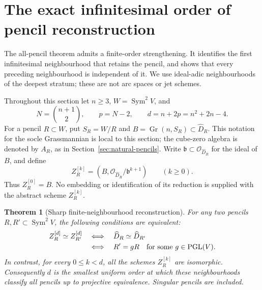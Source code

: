 \documentclass[11pt,reqno]{amsart}
\numberwithin{equation}{section}
\newtheorem{theorem}{Theorem}[section]
\theoremstyle{definition}\newtheorem{definition}[theorem]{Definition}
\theoremstyle{remark}\newtheorem{remark}[theorem]{Remark}
\newcommand{\OO}{\mathcal O}\newcommand{\II}{\mathcal I}
\DeclareMathOperator{\Sym}{Sym}\DeclareMathOperator{\Gr}{Gr}
\begin{document}

\section{The exact infinitesimal order of pencil reconstruction}
\label{sec:finite-neighbourhoods}

The all-pencil theorem admits a finite-order strengthening.  It
identifies the first infinitesimal neighbourhood that retains the
pencil, and shows that every preceding neighbourhood is independent
of it.  We use ideal-adic neighbourhoods of the deepest stratum;
these are not arc spaces or jet schemes.

Throughout this section let \(n\ge3\), \(W=\Sym^2V\), and
\begin{equation}\label{eq:pencil-detection-order}
 N=\binom{n+1}{2},\qquad p=N-2,\qquad
 d=n+2p=n^2+2n-4.
\end{equation}
For a pencil \(R\subset W\), put \(S_R=W/R\) and
\(B=\Gr(n,S_R)\subset\widehat D_R\).  This notation for the
socle Grassmannian is local to this section; the cube-zero algebra
is denoted by \(A_R\), as in Section~\ref{sec:natural-pencils}.
Write \(\mathfrak b\subset\OO_{\widehat D_R}\) for the
ideal of \(B\), and define
\begin{equation}\label{eq:finite-neighbourhood-definition}
 Z_R^{[k]}=(B,\OO_{\widehat D_R}/\mathfrak b^{k+1})
       \qquad(k\ge0).
\end{equation}
Thus \(Z_R^{[0]}=B\).  No embedding or identification of its
reduction is supplied with the abstract scheme \(Z_R^{[k]}\).

\begin{theorem}[Sharp finite-neighbourhood reconstruction]
\label{thm:sharp-finite-pencil}
For any two pencils \(R,R'\subset\Sym^2V\), the following
conditions are equivalent:
\begin{equation}\label{eq:finite-pencil-equivalences}
\begin{split}
 Z_R^{[d]}\simeq Z_{R'}^{[d]}
 &\quad\Longleftrightarrow\quad
 \widehat D_R\simeq\widehat D_{R'}\\
 &\quad\Longleftrightarrow\quad
 R'=gR\quad\text{for some }g\in\operatorname{PGL}(V).
\end{split}
\end{equation}
In contrast, for every \(0\le k<d\), all the schemes
\(Z_R^{[k]}\) are isomorphic.  Consequently \(d\) is the
smallest uniform order at which these neighbourhoods classify all
pencils up to projective equivalence.  Singular pencils are included.
\end{theorem}
\end{document}
